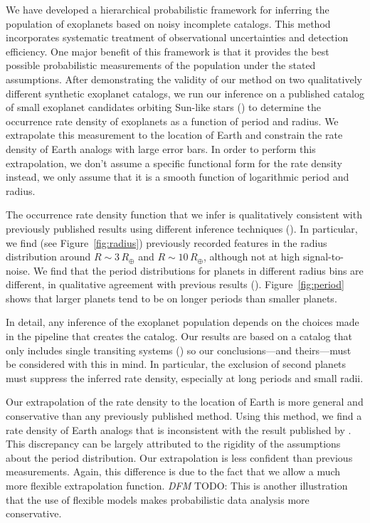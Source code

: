 \documentclass[12pt,preprint]{aastex}
\newcommand{\figref}[1]{\ref{fig:#1}}
\newcommand{\Fig}[1]{Figure~\figref{#1}}
\newcommand{\fig}[1]{\Fig{#1}}
\newcommand{\todo}[3]{{\color{#2} \emph{#1} TODO: #3}}
\newcommand{\dfmtodo}[1]{\todo{DFM}{red}{#1}}
\newcommand{\radius}{\ensuremath{R}}
\begin{document}
We have developed a hierarchical probabilistic framework for inferring the
population of exoplanets based on noisy incomplete catalogs.
This method incorporates systematic treatment of observational uncertainties
and detection efficiency.
One major benefit of this framework is that it provides the best possible
probabilistic measurements of the population under the stated assumptions.
After demonstrating the validity of our method on two qualitatively different
synthetic exoplanet catalogs, we run our inference on a published catalog of
small exoplanet candidates orbiting Sun-like stars (\citealt{petigura}) to
determine the occurrence rate density of exoplanets as a function of period
and radius.
We extrapolate this measurement to the location of Earth and constrain the
rate density of Earth analogs with large error bars.
In order to perform this extrapolation, we don't assume a specific functional
form for the rate density instead, we only assume that it is a smooth function
of logarithmic period and radius.

The occurrence rate density function that we infer is qualitatively consistent
with previously published results using different inference techniques
(\citealt{dong, fressin-fp, petigura}).
In particular, we find (see \fig{radius}) previously recorded features in the
radius distribution around $\radius\sim 3\,\radius_\oplus$ and $\radius\sim
10\,\radius_\oplus$, although not at high signal-to-noise.
We find that the period distributions for planets in different radius bins are
different, in qualitative agreement with previous results (\citealt{dong}).
\Fig{period} shows that larger planets tend to be on longer periods than
smaller planets.

In detail, any inference of the exoplanet population depends on the choices
made in the pipeline that creates the catalog.
Our results are based on a catalog that only includes single transiting
systems (\citealt{petigura}) so our conclusions---and theirs---must be
considered with this in mind.
In particular, the exclusion of second planets must suppress the inferred rate
density, especially at long periods and small radii.

Our extrapolation of the rate density to the location of Earth is more general
and conservative than any previously published method.
Using this method, we find a rate density of Earth analogs that is
inconsistent with the result published by \citet{petigura}.
This discrepancy can be largely attributed to the rigidity of the assumptions
about the period distribution.
Our extrapolation is less confident than previous measurements.
Again, this difference is due to the fact that we allow a much more flexible
extrapolation function.
\dfmtodo{This is another illustration that the use of flexible models makes
probabilistic data analysis more conservative.}
\end{document}
